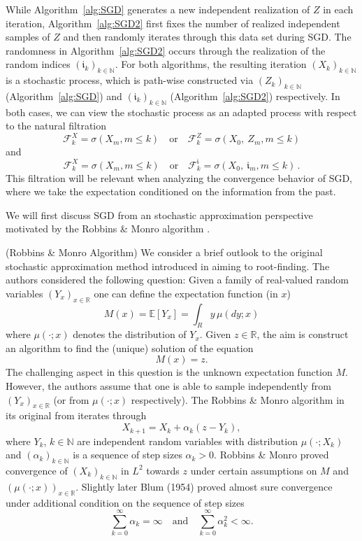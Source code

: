 \documentclass[12pt,openany]{book}
\theoremstyle{definition}
\theoremstyle{definition}
\newcommand{\E}{\mathbb{E}}
\newcommand{\N}{\mathbb{N}}
\newcommand{\R}{\mathbb{R}}
\begin{document}
While Algorithm~\ref{alg:SGD} generates a new independent realization of $Z$ in each iteration, Algorithm~\ref{alg:SGD2} first fixes the number of realized independent samples of $Z$ and then randomly iterates through this data set during SGD. The randomness in Algorithm~\ref{alg:SGD2} occurs through the realization of the random indices $(\mathfrak i_k)_{k\in\N}$. For both algorithms, the resulting iteration $(X_k)_{k\in\N}$ is a stochastic process, which is path-wise constructed via $(Z_k)_{k\in\N}$ (Algorithm~\ref{alg:SGD}) and $(\mathfrak i_k)_{k\in\N}$ (Algorithm~\ref{alg:SGD2}) respectively. In both cases, we can view the stochastic process as an adapted process with respect to the natural filtration
\[\mathcal F_k^X = \sigma(X_m,m\le k)\quad \text{or}\quad \mathcal F_k^Z = \sigma(X_0,\ Z_m,m\le k) \]
and 
\[\mathcal F_k^X = \sigma(X_m,m\le k)\quad\text{or}\quad \mathcal F_k^{\mathfrak i} = \sigma(X_0,\ \mathfrak i_m,m\le k)\,.\]
This filtration will be relevant when analyzing the convergence behavior of SGD, where we take the expectation conditioned on the information from the past. 

We will first discuss SGD from an stochastic approximation perspective motivated by the Robbins \& Monro algorithm \cite{RM1951}. 
\begin{outlook}(Robbins \& Monro Algorithm)  
We consider a brief outlook to the original stochastic approximation method introduced in \cite{RM1951} aiming to root-finding. The authors considered the following question: Given a family of real-valued random variables $(Y_x)_{x\in\R}$ one can define the expectation function (in $x$)
\[M(x) = \E[Y_x] = \int_R y\, \mu(dy;x) \]
where $\mu(\cdot; x)$ denotes the distribution of $Y_x$. Given $z\in\R$, the aim is construct an algorithm to find the (unique) solution of the equation
\[M(x) = z.\]
The challenging aspect in this question is the unknown expectation function $M$. However, the authors assume that one is able to sample independently from $(Y_x)_{x\in\R}$ (or from  $\mu(\cdot; x)$ respectively). The Robbins \& Monro algorithm in its original from iterates through 
\[X_{k+1} = X_k + \alpha_k (z-Y_k), \]
where $Y_k$, $k\in\N$ are independent random variables with distribution $\mu(\cdot; X_k)$ and $(\alpha_k)_{k\in\N}$ is a sequence of step sizes $\alpha_k>0$. Robbins \& Monro proved convergence of $(X_k)_{k\in\N}$ in $L^2$ towards $z$ under certain assumptions on $M$ and $(\mu(\cdot; x))_{x\in\R}$. Slightly later Blum \cite{Blum1954} (1954) proved almost sure convergence under additional condition on the sequence of step sizes
\[\sum_{k=0}^\infty \alpha_k =\infty\quad \text{and}\quad \sum_{k=0}^\infty \alpha_k^2 <\infty. \]
\end{outlook}
\end{document}
